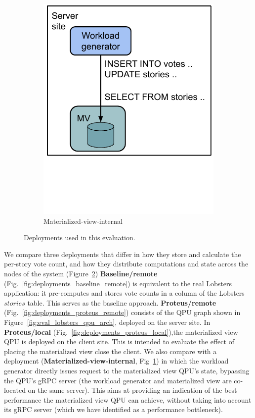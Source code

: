 \begin{figure}[H]
\begin{subfigure}[b]{0.24\textwidth}
            \includegraphics[width=\textwidth]{./figures/evaluation/evaluation_deployments_internal.pdf}
            \caption{Materialized-view-internal}
            \label{fig:deployments_mv_internal}
        \end{subfigure}
        \caption{Deployments used in this evaluation.}
        \label{fig:eval_deployments}
    \end{figure}

We compare three deployments that differ in how they store and calculate the per-story vote count,
and how they distribute computations and state across the nodes of the system (Figure~\ref{fig:eval_deployments})
\textbf{Baseline/remote} (Fig.~\ref{fig:deployments_baseline_remote}) is equivalent to the real Lobsters application:
it pre-computes and stores vote counts in a column of the Lobsters $stories$ table.
This serves as the baseline approach.
\textbf{Proteus/remote} (Fig.~\ref{fig:deployments_proteus_remote}) consists of the QPU graph shown in Figure~\ref{fig:eval_lobsters_qpu_arch},
deployed on the server site.
In \textbf{Proteus/local} (Fig.~\ref{fig:deployments_proteus_local}),the materialized view QPU is deployed on the client site.
This is intended to evaluate the effect of placing the materialized view close the client.
We also compare with a deployment (\textbf{Materialized-view-internal}, Fig~\ref{fig:deployments_mv_internal}) in which the workload generator
directly issues request to the materialized view QPU's state, bypassing the QPU's gRPC server
(the workload generator and materialized view are co-located on the same server).
This aims at providing an indication of the best performance the materialized view QPU can achieve,
without taking into account its gRPC server (which we have identified as a performance bottleneck).

